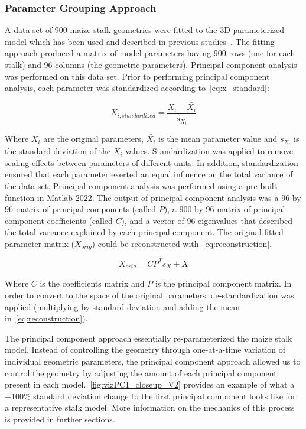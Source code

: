 \subsubsection{Parameter Grouping Approach}
\label{sssec:parameter_grouping_approach}
A data set of 900 maize stalk geometries were fitted to the 3D parameterized model which has been used and described in previous studies~. The fitting approach produced a matrix of model parameters having 900 rows (one for each stalk) and 96 columns (the geometric parameters). Principal component analysis was performed on this data set. Prior to performing principal component analysis, each parameter was standardized according to~\cref{eq:x_standard}:

\begin{equation}
	\label{eq:x_standard}
	X_{i, standardized} = \frac{X_{i} - \bar{X_{i}}}{s_{X_{i}}}
\end{equation}

Where ${X_{i}}$ are the original parameters, ${\bar{X_{i}}}$ is the mean parameter value and ${s_{X_{i}}}$ is the standard deviation of the ${X_{i}}$ values. Standardization was applied to remove scaling effects between parameters of different units. In addition, standardization ensured that each parameter exerted an equal influence on the total variance of the data set. Principal component analysis was performed using a pre-built function in Matlab 2022. The output of principal component analysis was a 96 by 96 matrix of principal components (called ${P}$), a 900 by 96 matrix of principal component coefficients (called ${C}$), and a vector of 96 eigenvalues that described the total variance explained by each principal component. The original fitted parameter matrix (${X_{orig}}$) could be reconstructed with~\cref{eq:reconstruction}.

\begin{equation}
	\label{eq:reconstruction}
	X_{orig} = CP^{T}s_{X} + \bar{X}
\end{equation}

Where ${C}$ is the coefficients matrix and ${P}$ is the principal component matrix. In order to convert to the space of the original parameters, de-standardization was applied (multiplying by standard deviation and adding the mean in~\cref{eq:reconstruction}). 

The principal component approach essentially re-parameterized the maize stalk model. Instead of controlling the geometry through one-at-a-time variation of individual geometric parameters, the principal component approach allowed us to control the geometry by adjusting the amount of each principal component present in each model.~\cref{fig:vizPC1_closeup_V2} provides an example of what a +100\% standard deviation change to the first principal component looks like for a representative stalk model. More information on the mechanics of this process is provided in further sections.

